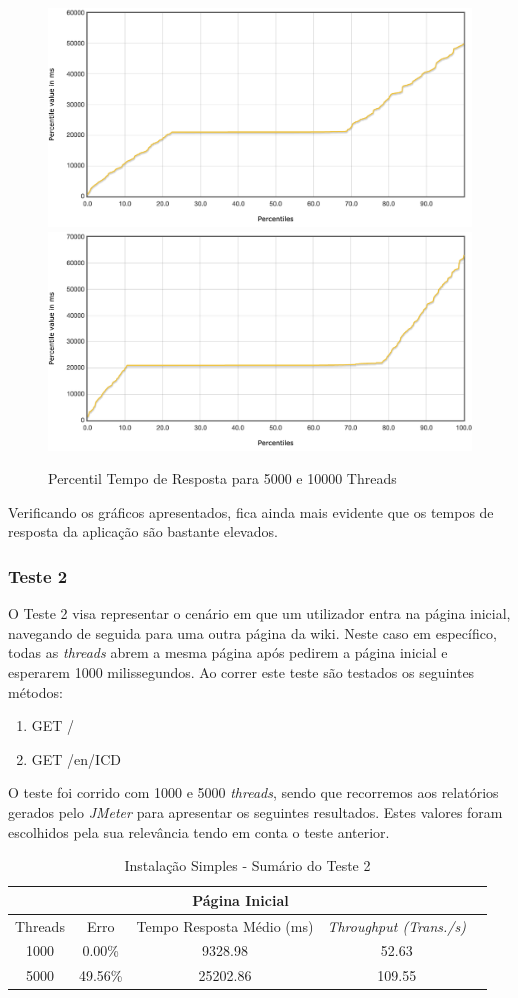 \begin{figure}[ht!]
    \centering
    \includegraphics[width=.45\linewidth]{img/testes/i-t1-5000.png}
    \includegraphics[width=.45\linewidth]{img/testes/i-t1-10000.png}
    \caption{Percentil Tempo de Resposta para 5000 e 10000 Threads}
\end{figure}

\vspace{2cm}
Verificando os gráficos apresentados, fica ainda mais evidente que os tempos de resposta da aplicação são bastante elevados.

\subsubsection{Teste 2}

O Teste 2 visa representar o cenário em que um utilizador entra na página inicial, navegando de seguida para uma outra página da wiki. Neste caso em específico, todas as \textit{threads} abrem a mesma página após pedirem a página inicial e esperarem 1000 milissegundos. Ao correr este teste são testados os seguintes métodos:

\begin{enumerate}
  \item GET /
  \item GET /en/ICD
\end{enumerate}

O teste foi corrido com 1000 e 5000 \textit{threads}, sendo que recorremos aos relatórios gerados pelo \textit{JMeter} para apresentar os seguintes resultados. Estes valores foram escolhidos pela sua relevância tendo em conta o teste anterior.

\begin{table}[h!]
\centering
    \begin{tabular}{ |c|c|c|c|c|  }
        \hline
        \multicolumn{4}{|c|}{Página Inicial} \\
        \hline
         Threads & Erro & Tempo Resposta Médio (ms) & \textit{Throughput (Trans./s)}\\
        \hline
        1000  & 0.00\%   & 9328.98  & 52.63\\
        5000  & 49.56\%  & 25202.86 & 109.55\\
        \hline
    \end{tabular}
    \caption{Instalação Simples - Sumário do Teste 2}
    \label{table:1}
\end{table}

